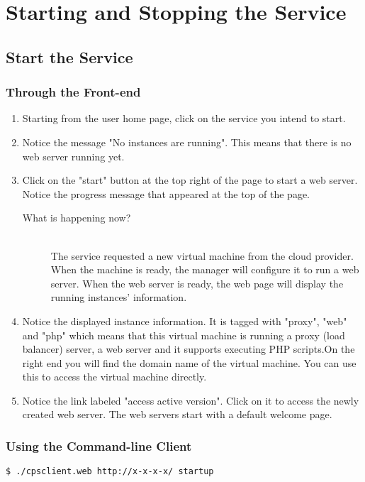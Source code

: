 \documentclass[10pt]{article}
\newenvironment{what}
{\begin{description} \item [What is happening now?] \hfill \\}
{\end{description}}
\newenvironment{framedbox}[1]%
{\begin{framed}
 \begingroup
 \fontsize{#1}{#1}\selectfont
}
{
 \endgroup
 \end{framed}
}
\begin{document}
\section{Starting and Stopping the Service}

\subsection{Start the Service}
\subsubsection{Through the Front-end}
\begin{enumerate}
\item Starting from the user home page, click on the service you intend to start.
\item Notice the message "No instances are running". This means that there is no
      web server running yet.
\item Click on the "start" button at the top right
      of the page to start a web server. Notice the progress message that
      appeared at the top of the page.
      \begin{what}
        The service requested a new virtual machine from the cloud provider.
        When the machine is ready, the manager will configure it to run
        a web server. When the web server is ready, the web page will
        display the running instances' information.
      \end{what}
\item Notice the displayed instance information. It is tagged with "proxy",
      "web" and "php" which means that this virtual machine is running a proxy
      (load balancer) server, a web server and it supports executing PHP
      scripts.On the right end you will find the domain name of the virtual
      machine. You can use this to access the virtual machine directly.
\item Notice the link labeled "access active version". Click on it to access
      the newly created web server. The web servers start with a default
      welcome page.
\end{enumerate}

\subsubsection{Using the Command-line Client}
\begin{framedbox}{8pt}\begin{verbatim}
$ ./cpsclient.web http://x-x-x-x/ startup
\end{verbatim}\end{framedbox}
\end{document}
